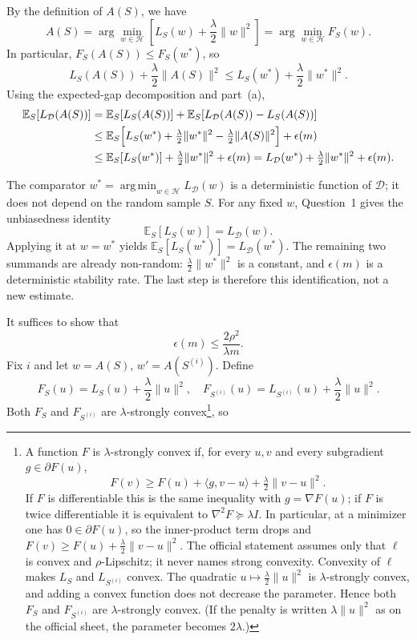 \documentclass[11pt,a4paper]{article}
\DeclareMathOperator*{\argmin}{arg\,min}
\theoremstyle{definition}
\begin{document}
By the definition of $A(S)$, we have
\[
A(S) = \arg \min_{w \in \mathcal{H}} \left[L_S(w)+\frac{\lambda}{2}\|w\|^2\right]=\arg\min_{w \in \mathcal{H}} F_S(w).
\]
In particular, $F_S(A(S)) \le F_S(w^*)$, so
\[
L_{S}(A(S)) + \frac{\lambda}{2}\|A(S)\|^{2} \leq L_{S}(w^*) + \frac{\lambda}{2}\|w^*\|^{2}.
\]
Using the expected-gap decomposition and part~(a),
\begin{align*}
\mathbb{E}_{S}[L_{\mathcal{D}}(A(S))]
&= \mathbb{E}_{S}[L_{S}(A(S))] + \mathbb{E}_{S} [L_{\mathcal{D}}(A(S)) - L_{S}(A(S))] \\
&\leq \mathbb{E}_{S}\Bigl[L_{S}(w^*) + \tfrac{\lambda}{2}\|w^*\|^{2} - \tfrac{\lambda}{2}\|A(S)\|^{2}\Bigr] + \epsilon(m) \\
&\leq \mathbb{E}_{S}[L_{S}(w^*)] + \tfrac{\lambda}{2}\|w^*\|^{2} + \epsilon(m)
= L_{\mathcal{D}}(w^*) + \tfrac{\lambda}{2}\|w^*\|^{2} + \epsilon(m).
\end{align*}
\begin{remark}
The comparator \(w^*=\argmin_{w\in\mathcal{H}}L_{\mathcal{D}}(w)\) is a deterministic function of \(\mathcal{D}\); it does not depend on the random sample \(S\). For any fixed \(w\), Question~1 gives the unbiasedness identity
\[
\mathbb{E}_S[L_S(w)]=L_{\mathcal{D}}(w).
\]
Applying it at \(w=w^*\) yields \(\mathbb{E}_S[L_S(w^*)]=L_{\mathcal{D}}(w^*)\). The remaining two summands are already non-random: \(\tfrac{\lambda}{2}\|w^*\|^2\) is a constant, and \(\epsilon(m)\) is a deterministic stability rate. The last step is therefore this identification, not a new estimate.
\end{remark}
It suffices to show that
\[
  \epsilon(m) \leq \frac{2\rho^2}{\lambda m}.
\]
Fix $i$ and let $w = A(S)$, $w' = A(S^{(i)})$. Define
\[
F_S(u) = L_S(u) + \frac{\lambda}{2}\|u\|^2, \quad F_{S^{(i)}}(u) = L_{S^{(i)}}(u) + \frac{\lambda}{2}\|u\|^2.
\]
Both $F_S$ and $F_{S^{(i)}}$ are $\lambda$-strongly convex\footnote{A function $F$ is $\lambda$-strongly convex if, for every $u,v$ and every subgradient $g\in\partial F(u)$,
\[
F(v)\ge F(u)+\langle g,v-u\rangle+\tfrac{\lambda}{2}\|v-u\|^2.
\]
If $F$ is differentiable this is the same inequality with $g=\nabla F(u)$; if $F$ is twice differentiable it is equivalent to $\nabla^2 F\succeq\lambda I$. In particular, at a minimizer one has $0\in\partial F(u)$, so the inner-product term drops and $F(v)\ge F(u)+\tfrac{\lambda}{2}\|v-u\|^2$. The official statement assumes only that $\ell$ is convex and $\rho$-Lipschitz; it never names strong convexity. Convexity of $\ell$ makes $L_S$ and $L_{S^{(i)}}$ convex. The quadratic $u\mapsto\tfrac{\lambda}{2}\|u\|^2$ is $\lambda$-strongly convex, and adding a convex function does not decrease the parameter. Hence both $F_S$ and $F_{S^{(i)}}$ are $\lambda$-strongly convex. (If the penalty is written $\lambda\|u\|^2$ as on the official sheet, the parameter becomes $2\lambda$.)}, so
\end{document}

